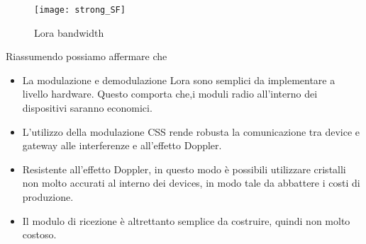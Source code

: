 \begin{figure}[h]
        \centering 
                \texttt{[image: strong\_SF]}
        \caption{Lora bandwidth }
\end{figure}
Riassumendo possiamo affermare che 
\begin{itemize}
        \item   La modulazione e demodulazione Lora sono semplici da implementare 
                a livello hardware. Questo comporta che,i moduli radio 
                all'interno dei dispositivi saranno economici.
        \item   L'utilizzo della modulazione CSS rende robusta la comunicazione
                tra device e gateway alle interferenze e all'effetto Doppler. 
                
\item Resistente  all'effetto Doppler, in questo modo è possibili utilizzare
cristalli non molto accurati al interno dei devices, in modo tale da abbattere i
costi di produzione.
\item Il modulo di ricezione è altrettanto semplice da costruire, quindi non
molto costoso.
\end{itemize}

